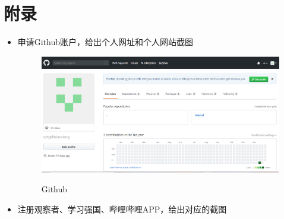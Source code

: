 \documentclass{article}
\begin{document}
\section{附录}
\begin{itemize}
    \item 申请Github账户，给出个人网址和个人网站截图
    \begin{figure}[h!]
    	\centering
    	\includegraphics[scale=0.25]{github}
    	\label{fig:github}
    	\caption{Github}
    \end{figure}
    \item 注册观察者、学习强国、哔哩哔哩APP，给出对应的截图
    \begin{figure}[h!]
    \centering

\end{figure}
\end{itemize}
\end{document}
